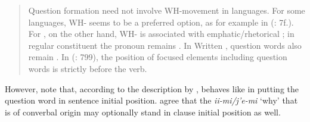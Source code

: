 \begin{quote}
Question formation need not involve WH-movement in  languages. For some languages, WH- seems to be a preferred option, as for example in  (\citealt{Nedjalkov1997}: 7f.). For , on the other hand, WH- is associated with emphatic/rhetorical ; in regular constituent  the  pronoun remains  \citep{Malchukov2008}. In Written , question words also remain  \citep[222]{Gorelova2002}. In  (\citealt{NikolaevaTolskaya2001}: 799), the position of focused elements including question words is strictly before the verb.
\end{quote}

However, note that, according to the description by \citet[42]{Girfanova2002},  behaves like  in putting the question word in sentence initial position.  \citet[799, 805]{NikolaevaTolskaya2001} agree that the  \textit{ii-}\textit{mi/j’e-}\textit{mi} ‘why’ that is of converbal origin may optionally stand in clause initial position as well.

